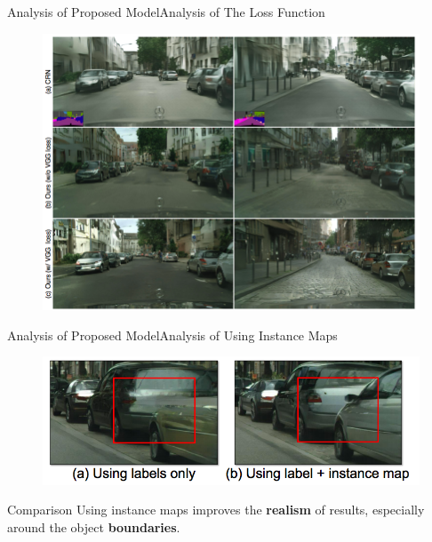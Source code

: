 \documentclass{beamer}
\begin{document}
\begin{frame}{Analysis of Proposed Model}{Analysis of The Loss Function}
\begin{figure}
	\centering
	\includegraphics[height=0.8\textheight]{images/result_3}
\end{figure}
\end{frame}

\begin{frame}{Analysis of Proposed Model}{Analysis of  Using Instance Maps}
\begin{figure}
	\centering
	\includegraphics[height=0.45\textheight]{images/instance_result}
\end{figure}
%
%
\begin{beamerboxesrounded}[upper=uppercol,lower=lowercol,shadow=false]{Comparison }
Using instance maps improves the \textbf{realism} of  results, especially around the object \textbf{boundaries}.
\end{beamerboxesrounded}
\end{frame}
\end{document}
